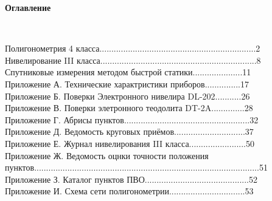 \documentclass[a4paper]{article}
\begin{document}
\begin{newpage} %
\large{
    \begin{center}
        \textbf{Оглавление}
    \end{center}
    ~\\
    \begin{center}
        Полигонометрия 4 класса..................................................................2\\
        Нивелирование III класса..................................................................8\\
        Спутниковые измерения методом быстрой статики.....................11\\
        Приложение А. Технические характристики приборов...............17\\
        Приложение Б. Поверки Электронного нивелира DL-202...........26\\
        Приложение В. Поверки элетронного теодолита DT-2A..............28\\
        Приложение Г. Абрисы пунктов.....................................................32\\
        Приложение Д. Ведомость круговых приёмов..............................37\\
        Приложение Е. Журнал нивелирования III класса........................50\\
        Приложение Ж. Ведомость оцнки точности положения\;\;\;\;\;\;\;\;\;\;\;\;\;\;\;\;\\
        пунктов...............................................................................................51\\
        Приложение З. Каталог пунктов ПВО............................................52\\
        Приложение И. Схема сети полигонометрии................................53\\
    \end{center}
}
\end{newpage}
\end{document}
